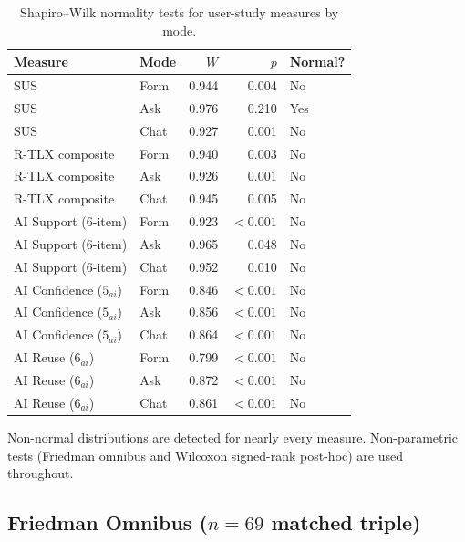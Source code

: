 \begin{table}[htbp]
\centering
\caption{Shapiro--Wilk normality tests for user-study measures by mode.}
\label{tab:app-survey-normality}
\small
\begin{tabular}{@{}l l r r l@{}}
\toprule
Measure & Mode & $W$ & $p$ & Normal? \\
\midrule
SUS & Form & 0.944 & 0.004 & No \\
SUS & Ask  & 0.976 & 0.210 & Yes \\
SUS & Chat & 0.927 & 0.001 & No \\
R-TLX composite & Form & 0.940 & 0.003 & No \\
R-TLX composite & Ask  & 0.926 & 0.001 & No \\
R-TLX composite & Chat & 0.945 & 0.005 & No \\
AI Support (6-item) & Form & 0.923 & $<0.001$ & No \\
AI Support (6-item) & Ask  & 0.965 & 0.048 & No \\
AI Support (6-item) & Chat & 0.952 & 0.010 & No \\
AI Confidence ($5_{ai}$) & Form & 0.846 & $<0.001$ & No \\
AI Confidence ($5_{ai}$) & Ask  & 0.856 & $<0.001$ & No \\
AI Confidence ($5_{ai}$) & Chat & 0.864 & $<0.001$ & No \\
AI Reuse ($6_{ai}$) & Form & 0.799 & $<0.001$ & No \\
AI Reuse ($6_{ai}$) & Ask  & 0.872 & $<0.001$ & No \\
AI Reuse ($6_{ai}$) & Chat & 0.861 & $<0.001$ & No \\
\bottomrule
\end{tabular}
\end{table}

Non-normal distributions are detected for nearly every measure. Non-parametric
tests (Friedman omnibus and Wilcoxon signed-rank post-hoc) are used
throughout.

\subsection{Friedman Omnibus ($n = 69$ matched triple)}

